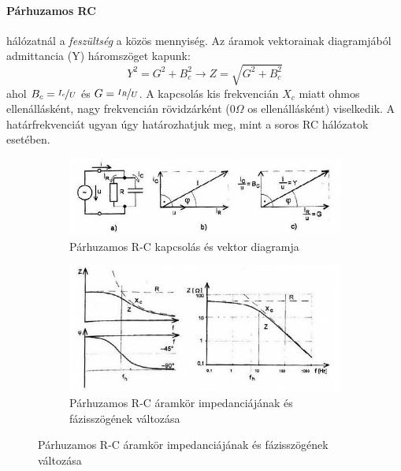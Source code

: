 \paragraph{Párhuzamos RC} hálózatnál a \emph{feszültség} a közös mennyiség. Az áramok vektorainak diagramjából admittancia (Y) háromszöget kapunk:
$$Y^2 = G^2 + B_c^2 \rightarrow Z = \sqrt{G^2 + B_c^2}$$
ahol $B_c = \nicefrac{I_c}{U}$ és $G=\nicefrac{I_R}{U}$.
A kapcsolás kis frekvencián $X_c$ miatt ohmos ellenállásként, nagy frekvencián rövidzárként ($0\Omega$ os ellenállásként) viselkedik. A határfrekvenciát ugyan úgy határozhatjuk meg, mint a soros RC hálózatok esetében.
\begin{figure}[h]
	\centering
	\begin{subfigure}[b]{0.45\textwidth}
		\centering
		\includegraphics[width=\linewidth]{fig/10-parallelRC_Schematic}
		\caption{Párhuzamos R-C kapcsolás és vektor diagramja}
		\label{fig:10-parallelrcschematic}
	\end{subfigure}
	\begin{subfigure}[b]{0.45\textwidth}
		\centering
		\includegraphics[width=\linewidth]{fig/10-parallelRC_Plot}
		\caption{Párhuzamos R-C áramkör impedanciájának és fázisszögének változása}
		\label{fig:10-parallelrcplot}
	\end{subfigure}
\end{figure}

